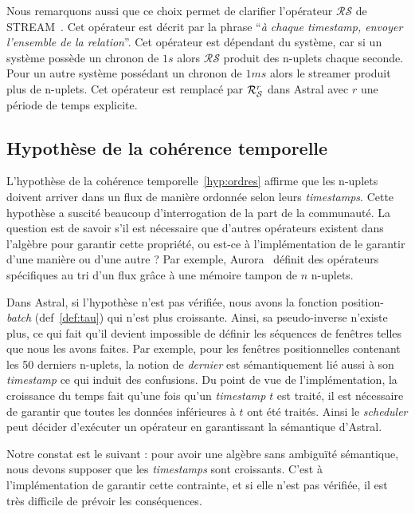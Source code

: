 Nous remarquons aussi que ce choix permet de clarifier l'opérateur $\mathcal{RS}$ de STREAM~\cite{Arasu:stream}. Cet opérateur est décrit par la phrase \enquote{\it à chaque timestamp, envoyer l'ensemble de la relation}. Cet opérateur est dépendant du système, car si un système possède un chronon de $1s$ alors $\mathcal{RS}$ produit des n-uplets chaque seconde. Pour un autre système possédant un chronon de $1ms$ alors le streamer produit plus de n-uplets. Cet opérateur est remplacé par $\mathcal{R}_{\mathcal S}^{r}$ dans Astral avec $r$ une période de temps explicite.

\subsection{Hypothèse de la cohérence temporelle}\label{sec:valid:expressivite:modele:coherence}
L'hypothèse de la cohérence temporelle~\ref{hyp:ordres} affirme que les n-uplets doivent arriver dans un flux de manière ordonnée selon leurs \textit{timestamps}. Cette hypothèse a suscité beaucoup d'interrogation de la part de la communauté. La question est de savoir s'il est nécessaire que d'autres opérateurs existent dans l'algèbre pour garantir cette propriété, ou est-ce à l'implémentation de le garantir d'une manière ou d'une autre ? Par exemple, Aurora~\cite{Abadi:aurora} définit des opérateurs spécifiques au tri d'un flux grâce à une mémoire tampon de $n$ n-uplets.

Dans Astral, si l'hypothèse n'est pas vérifiée, nous avons la fonction position-\textit{batch} (def~\ref{def:tau}) qui n'est plus croissante. Ainsi, sa pseudo-inverse n'existe plus, ce qui fait qu'il devient impossible de définir les séquences de fenêtres telles que nous les avons faites. Par exemple, pour les fenêtres positionnelles contenant les 50 derniers n-uplets, la notion de \textit{dernier} est sémantiquement lié aussi à son \textit{timestamp} ce qui induit des confusions. Du point de vue de l’implémentation, la croissance du temps fait qu'une fois qu'un \textit{timestamp} $t$ est traité, il est nécessaire de garantir que toutes les données inférieures à $t$ ont été traités. Ainsi le \textit{scheduler} peut décider d'exécuter un opérateur en garantissant la sémantique d'Astral.

Notre constat est le suivant : pour avoir une algèbre sans ambiguïté sémantique, nous devons supposer que les \textit{timestamps} sont croissants. C'est à l'implémentation de garantir cette contrainte, et si elle n'est pas vérifiée, il est très difficile de prévoir les conséquences.

